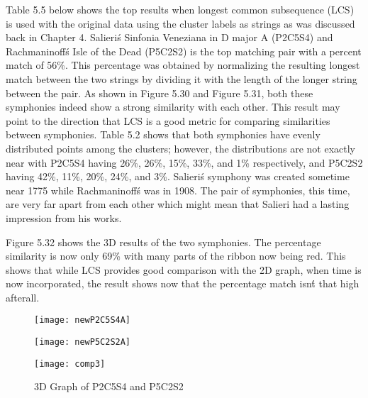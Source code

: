 Table 5.5 below shows the top results when longest common subsequence (LCS) is used with the original data using the cluster labels as strings as was discussed back in Chapter 4. Salieri\'s Sinfonia Veneziana in D major A (P2C5S4) and Rachmaninoff\'s Isle of the Dead (P5C2S2) is the top matching pair with a percent match of 56\%. This percentage was obtained by normalizing the resulting longest match between the two strings by dividing it with the length of the longer string between the pair. As shown in Figure 5.30 and Figure 5.31, both these symphonies indeed show a strong similarity with each other. This result may point to the direction that LCS is a good metric for comparing similarities between symphonies. Table 5.2 shows that both symphonies have evenly distributed points among the clusters; however, the distributions are not exactly near with P2C5S4 having 26\%, 26\%, 15\%, 33\%, and 1\% respectively, and P5C2S2 having 42\%, 11\%, 20\%, 24\%, and 3\%. Salieri\'s symphony was created sometime near 1775 while Rachmaninoff\'s was in 1908. The pair of symphonies, this time, are very far apart from each other which might mean that Salieri had a lasting impression from his works.

Figure 5.32 shows the 3D results of the two symphonies. The percentage similarity is now only 69\% with many parts of the ribbon now being red. This shows that while LCS provides good comparison with the 2D graph, when time is now incorporated, the result shows now that the percentage match isn\'t that high afterall.

\begin{figure}[H]
\begin{minipage}{.5\textwidth}
  \centering
  \texttt{[image: newP2C5S4A]}
  \label{fig:test1}
\end{minipage}
\begin{minipage}{.5\textwidth}
  \centering
  \texttt{[image: newP5C2S2A]}
  \label{fig:test2}
\end{minipage}
\end{figure}

\begin{figure}[H]
\caption{3D Graph of P2C5S4 and P5C2S2}
\centering
\texttt{[image: comp3]}
\end{figure}


